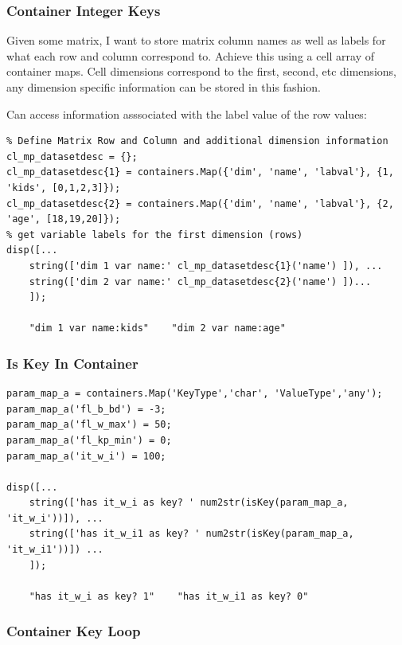 \documentclass[
]{book}
\begin{document}
\hypertarget{container-integer-keys}{%
\subsubsection{Container Integer Keys}\label{container-integer-keys}}

Given some matrix, I want to store matrix column names as well as labels
for what each row and column correspond to. Achieve this using a cell
array of container maps. Cell dimensions correspond to the first,
second, etc dimensions, any dimension specific information can be stored
in this fashion.

Can access information asssociated with the label value of the row
values:

\begin{verbatim}
% Define Matrix Row and Column and additional dimension information
cl_mp_datasetdesc = {};
cl_mp_datasetdesc{1} = containers.Map({'dim', 'name', 'labval'}, {1, 'kids', [0,1,2,3]});
cl_mp_datasetdesc{2} = containers.Map({'dim', 'name', 'labval'}, {2, 'age', [18,19,20]});
% get variable labels for the first dimension (rows)
disp([...
    string(['dim 1 var name:' cl_mp_datasetdesc{1}('name') ]), ...
    string(['dim 2 var name:' cl_mp_datasetdesc{2}('name') ])...
    ]);

    "dim 1 var name:kids"    "dim 2 var name:age"
\end{verbatim}

\hypertarget{is-key-in-container}{%
\subsubsection{Is Key In Container}\label{is-key-in-container}}

\begin{verbatim}
param_map_a = containers.Map('KeyType','char', 'ValueType','any');
param_map_a('fl_b_bd') = -3;
param_map_a('fl_w_max') = 50;
param_map_a('fl_kp_min') = 0;
param_map_a('it_w_i') = 100;

disp([...
    string(['has it_w_i as key? ' num2str(isKey(param_map_a, 'it_w_i'))]), ...
    string(['has it_w_i1 as key? ' num2str(isKey(param_map_a, 'it_w_i1'))]) ...
    ]);

    "has it_w_i as key? 1"    "has it_w_i1 as key? 0"
\end{verbatim}

\hypertarget{container-key-loop}{%
\subsubsection{Container Key Loop}\label{container-key-loop}}
\end{document}
